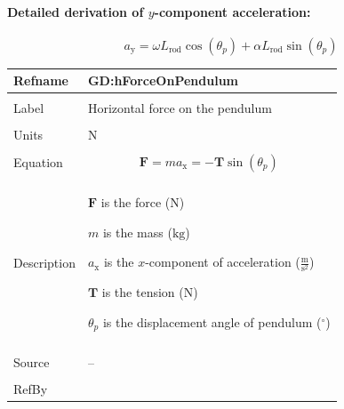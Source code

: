 \documentclass[12pt]{article}
\begin{document}
\paragraph{Detailed derivation of $y$-component acceleration:}
\label{GD:accelerationIYDeriv}
\begin{displaymath}
{a_{\text{y}}}=ω {L_{\text{rod}}} \cos\left({θ_{p}}\right)+α {L_{\text{rod}}} \sin\left({θ_{p}}\right)
\end{displaymath}
\vspace{\baselineskip}
\noindent
\begin{minipage}{\textwidth}
\begin{tabular}{>{\raggedright}p{}>{\raggedright\arraybackslash}p{}}
\toprule \textbf{Refname} & \textbf{GD:hForceOnPendulum}
\label{GD:hForceOnPendulum}
\\ \midrule \\
Label & Horizontal force on the pendulum
        
\\ \midrule \\
Units & ${\text{N}}$
        
\\ \midrule \\
Equation & \begin{displaymath}
           \mathbf{F}=m {a_{\text{x}}}=-\mathbf{T} \sin\left({θ_{p}}\right)
           \end{displaymath}
\\ \midrule \\
Description & \begin{symbDescription}
              \item{$\mathbf{F}$ is the force (${\text{N}}$)}
              \item{$m$ is the mass (${\text{kg}}$)}
              \item{${a_{\text{x}}}$ is the $x$-component of acceleration ($\frac{\text{m}}{\text{s}^{2}}$)}
              \item{$\mathbf{T}$ is the tension (${\text{N}}$)}
              \item{${θ_{p}}$ is the displacement angle of pendulum (${{}^{\circ}}$)}
              \end{symbDescription}
\\ \midrule \\
Source & --
         
\\ \midrule \\
RefBy & 
\\ \bottomrule
\end{tabular}
\end{minipage}
\end{document}

